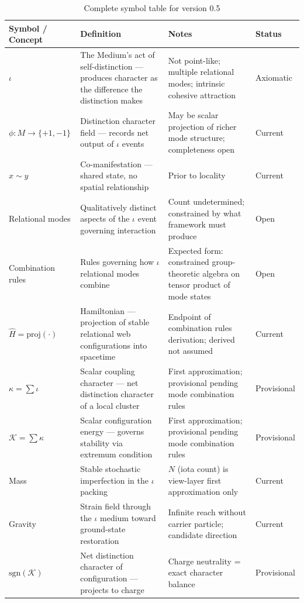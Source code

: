 \documentclass[11pt,letterpaper]{article}
\newcommand{\Kappa}{\mathcal{K}}
\begin{document}
\begin{table}[htbp]
\caption{Complete symbol table for version 0.5}
\centering
\begin{tabular}{llp{4.5cm}l}
\toprule
\textbf{Symbol / Concept} & \textbf{Definition} & \textbf{Notes} & \textbf{Status}\\[0pt]
\midrule
\(\iota\) & The Medium's act of self-distinction --- produces character as the difference the distinction makes & Not point-like; multiple relational modes; intrinsic cohesive attraction & Axiomatic\\[0pt]
\(\phi : M \to \{+1,-1\}\) & Distinction character field --- records net output of \(\iota\) events & May be scalar projection of richer mode structure; completeness open & Current\\[0pt]
\(x \sim y\) & Co-manifestation --- shared state, no spatial relationship & Prior to locality & Current\\[0pt]
Relational modes & Qualitatively distinct aspects of the \(\iota\) event governing interaction & Count undetermined; constrained by what framework must produce & Open\\[0pt]
Combination rules & Rules governing how \(\iota\) relational modes combine & Expected form: constrained group-theoretic algebra on tensor product of mode states & Open\\[0pt]
\(\hat{H} = \mathrm{proj}(\cdot)\) & Hamiltonian --- projection of stable relational web configurations into spacetime & Endpoint of combination rules derivation; derived not assumed & Current\\[0pt]
\(\kappa = \sum \iota\) & Scalar coupling character --- net distinction character of a local cluster & First approximation; provisional pending mode combination rules & Provisional\\[0pt]
\(\Kappa = \sum \kappa\) & Scalar configuration energy --- governs stability via extremum condition & First approximation; provisional pending mode combination rules & Provisional\\[0pt]
Mass & Stable stochastic imperfection in the \(\iota\) packing & \(N\) (iota count) is view-layer first approximation only & Current\\[0pt]
Gravity & Strain field through the \(\iota\) medium toward ground-state restoration & Infinite reach without carrier particle; candidate direction & Current\\[0pt]
\(\mathrm{sgn}(\Kappa)\) & Net distinction character of configuration --- projects to charge & Charge neutrality = exact character balance & Provisional\\[0pt]

\end{tabular}
\end{table}
\end{document}
